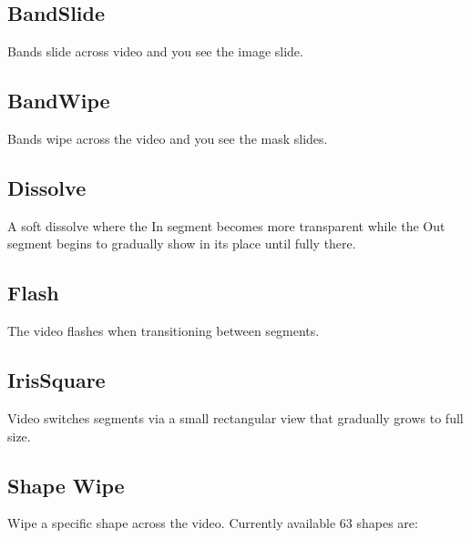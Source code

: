\subsection*{BandSlide}%
\label{sub:bandslide}

Bands slide across video and you see the image slide.

\subsection*{BandWipe}%
\label{sub:bandwipe}

Bands wipe across the video and you see the mask slides.

\subsection*{Dissolve}%
\label{sub:dissolve}

A soft dissolve where the In segment becomes more transparent while the Out segment begins to gradually show in its place until fully there.

\subsection*{Flash}%
\label{sub:flash}

The video flashes when transitioning between segments.

\subsection*{IrisSquare}%
\label{sub:irissquare}

Video switches segments via a small rectangular view that gradually grows to full size.

\subsection*{Shape Wipe}%
\label{sub:shape_wipe}

Wipe a specific shape across the video. Currently available 63 shapes are:


